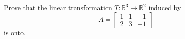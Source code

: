 \documentclass{ximera}
\renewcommand{\vec}[1]{{\bf #1}}
\newcommand{\RR}{\mathbb{R}}
\begin{document}
\begin{example}Prove that the linear transformation $T:\RR^3\rightarrow \RR^2$ induced by $$A=\begin{bmatrix}1&1&-1\\2&3&-1\end{bmatrix}$$ is onto.




\end{example}
\end{document}

